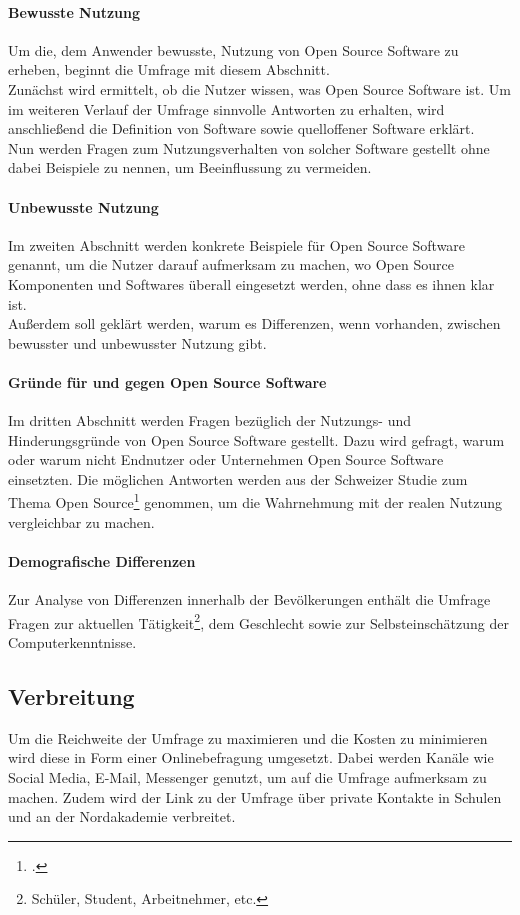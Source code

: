 \documentclass[a4paper]{article}
\begin{document}
			\paragraph{Bewusste Nutzung}
				Um die, dem Anwender bewusste, Nutzung von Open Source Software zu erheben, beginnt die Umfrage mit diesem Abschnitt.\\
				Zunächst wird ermittelt, ob die Nutzer wissen, was Open Source Software ist. Um im weiteren Verlauf der Umfrage sinnvolle Antworten zu erhalten, wird anschließend die Definition von Software sowie quelloffener Software erklärt.\\
				Nun werden Fragen zum Nutzungsverhalten von solcher Software gestellt ohne dabei Beispiele zu nennen, um Beeinflussung zu vermeiden.
			
			\paragraph{Unbewusste Nutzung}
				Im zweiten Abschnitt werden konkrete Beispiele für Open Source Software genannt, um die Nutzer darauf aufmerksam zu machen, wo Open Source Komponenten und Softwares überall eingesetzt werden, ohne dass es ihnen klar ist.\\
				Außerdem soll geklärt werden, warum es Differenzen, wenn vorhanden, zwischen bewusster und unbewusster Nutzung gibt.
			
			\paragraph{Gründe für und gegen Open Source Software}
				Im dritten Abschnitt werden Fragen bezüglich der Nutzungs- und Hinderungsgründe von Open Source Software gestellt. Dazu wird gefragt, warum oder warum nicht Endnutzer oder Unternehmen Open Source Software einsetzten. Die möglichen Antworten werden aus der Schweizer Studie zum Thema Open Source\footcite{oss:studie} genommen, um die Wahrnehmung mit der realen Nutzung vergleichbar zu machen.
			
			\paragraph{Demografische Differenzen}
				Zur Analyse von Differenzen innerhalb der Bevölkerungen enthält die Umfrage Fragen zur aktuellen Tätigkeit\footnote{Schüler, Student, Arbeitnehmer, etc.}, dem Geschlecht sowie zur Selbsteinschätzung der Computerkenntnisse.
				
		\subsection{Verbreitung}
			Um die Reichweite der Umfrage zu maximieren und die Kosten zu minimieren wird diese in Form einer Onlinebefragung umgesetzt. Dabei werden Kanäle wie Social Media, E-Mail, Messenger genutzt, um auf die Umfrage aufmerksam zu machen. Zudem wird der Link zu der Umfrage über private Kontakte in Schulen und an der Nordakademie verbreitet.
     
\end{document}
